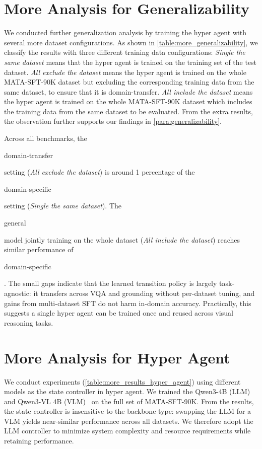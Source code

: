 \documentclass{article} %
\DeclareRobustCommand{\legendbg}[2]{%
\unskip
  \begingroup\setlength{\fboxsep}{0pt}
  \colorbox{#1}{\strut #2}%
  \endgroup
}
\newcommand{\revise}[1]{{#1}}
\newcommand{\methodname}{MATA}
\newcommand{\datasetname}{\methodname-SFT-90K}
\begin{document}
\section{More Analysis for Generalizability}
\label{sec:more_analysis_generalizability}

We conducted further generalization analysis by training the hyper agent with several more dataset configurations. As shown in \autoref{table:more_generalizability}, we classify the results with three different training data configurations: \emph{Single the same dataset} means that the hyper agent is trained on the training set of the test dataset. \emph{All exclude the dataset} means the hyper agent is trained on the whole \datasetname{} dataset but excluding the corresponding training data from the same dataset, to ensure that it is \revise{domain-transfer}. \emph{All include the dataset} means the hyper agent is trained on the whole \datasetname{} dataset which includes the training data from the same dataset to be evaluated. From the extra results, the observation further supports our findings in \autoref{para:generalizability}.

Across all benchmarks, the \legendbg{yellow!25}{\revise{domain-transfer}} setting (\emph{All exclude the dataset}) is around 1 percentage of the \legendbg{green!20}{domain-specific} setting (\emph{Single the same dataset}). The \legendbg{blue!15}{general} model jointly training on the whole dataset (\emph{All include the dataset}) reaches similar performance of \legendbg{green!20}{domain-specific}. The small gaps indicate that the learned transition policy is largely task-agnostic: it transfers across VQA and grounding without per-dataset tuning, and gains from multi-dataset SFT do not harm in-domain accuracy. Practically, this suggests a single hyper agent can be trained once and reused across visual reasoning tasks.


\section{\revise{More Analysis for Hyper Agent}}
\label{sec:more_analysis_hyper_agent}

\revise{We conduct experiments (\autoref{table:more_results_hyper_agent}) using different models as the state controller in hyper agent. We trained the Qwen3-4B (LLM)~\citep{yang_qwen3_2025} and Qwen3-VL 4B (VLM)~\citep{bai_qwen3-vl_2025} on the full set of \datasetname{}. From the results, the state controller is insensitive to the backbone type: swapping the LLM for a VLM yields near-similar performance across all datasets. We therefore adopt the LLM controller to minimize system complexity and resource requirements while retaining performance.}
\end{document}
